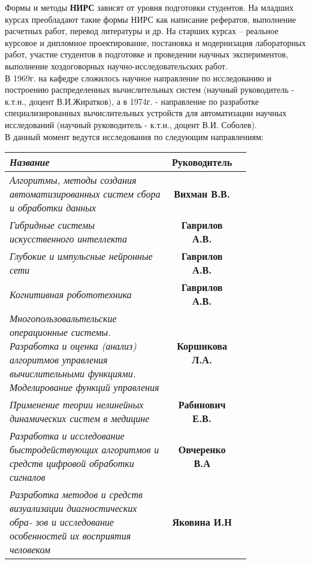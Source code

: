 \documentclass[12pt,a4paper]{article}
\begin{document}
\begin{flushleft}
\begin{flushleft}
Формы и методы \textbf{НИРС} зависят от уровня подготовки студентов. На младших курсах преобладают такие формы НИРС как написание рефератов, выполнение расчетных работ, перевод литературы и др. На старших курсах – реальное курсовое и дипломное проектирование, постановка и модернизация лабораторных работ, участие студентов в подготовке и проведении научных экспериментов, выполнение хоздоговорных научно-исследовательских работ.\\
В 1969г. на кафедре сложилось научное направление по исследованию и построению распределенных вычислительных систем (научный руководитель - к.т.н., доцент В.И.Жиратков), а в 1974г. - направление по разработке специализированных вычислительных устройств для автоматизации научных исследований (научный руководитель - к.т.н., доцент В.И. Соболев).
\\
В данный момент ведутся исследования по следующим направлениям:
\\
\begin{tabular}{||p{0.8\linewidth} || c||c||}
\hline
\emph{Название} & \textbf{Руководитель}\\
\hline
\textit{Алгоритмы, методы создания автоматизированных систем сбора и
обработки данных} & \textbf{Вихман В.В.}\\
\hline
\textit{Гибридные системы искусственного интеллекта} & \textbf{Гаврилов А.В.} \\
\hline

\textit{Глубокие и импульсные нейронные сети} & \textbf{Гаврилов А.В.} \\
\hline

\textit{Когнитивная робототехника} & \textbf{Гаврилов А.В.} \\
\hline

\textit{Многопользовальтельские операционные системы. Разработка и
оценка (анализ) алгоритмов управления вычислительными функциями. Моделирование функций управления} & \textbf{Коршикова Л.А.} \\
\hline

\textit{Применение теории нелинейных динамических систем в медицине} & \textbf{Рабинович Е.В.} \\
\hline

\textit{Разработка и исследование быстродействующих алгоритмов и
средств цифровой обработки сигналов} & \textbf{Овчеренко В.А} \\
\hline

\textit{Разработка методов и средств визуализации диагностических обра-
зов и исследование особенностей их восприятия человеком} & \textbf{Яковина И.Н} \\
\hline


\end{tabular}
\end{flushleft}
\end{flushleft}
\end{document}
